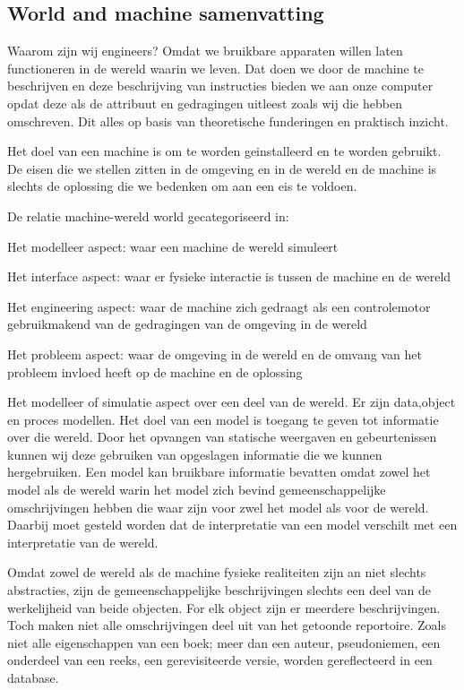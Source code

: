 \subsection{World and machine samenvatting}
Waarom zijn wij engineers? Omdat we bruikbare apparaten willen laten functioneren in de wereld waarin we leven. Dat doen we door de machine te beschrijven en deze beschrijving van instructies bieden we aan onze computer opdat deze als de attribuut en gedragingen uitleest zoals wij die hebben omschreven. Dit alles op basis van theoretische funderingen en praktisch inzicht. 

Het doel van een machine is om te worden geinstalleerd en te worden gebruikt. De eisen die we stellen zitten in de omgeving en in de wereld en de machine is slechts de oplossing die we bedenken om aan een eis te voldoen. 

De relatie machine-wereld world gecategoriseerd in: 

Het modelleer aspect: waar een machine de wereld simuleert 

Het interface aspect: waar er fysieke interactie is tussen de machine en de wereld 

Het engineering aspect: waar de machine zich gedraagt als een controlemotor gebruikmakend van de gedragingen van de omgeving in de wereld 

Het probleem aspect: waar de omgeving in de wereld en de omvang van het probleem invloed heeft op de machine en de oplossing 

Het modelleer  of simulatie aspect over een deel van de wereld. Er zijn data,object en proces modellen. Het doel van een model is toegang te geven tot informatie over die wereld. Door het opvangen van statische weergaven en gebeurtenissen kunnen wij deze gebruiken van opgeslagen informatie die we kunnen hergebruiken. Een model kan bruikbare informatie bevatten omdat zowel het model als de wereld warin het model zich bevind gemeenschappelijke omschrijvingen hebben die waar zijn voor zwel het model als voor de wereld. Daarbij moet gesteld worden dat de interpretatie van een model verschilt met een interpretatie van de wereld. 

Omdat zowel de wereld als de machine fysieke realiteiten zijn an niet slechts abstracties, zijn de gemeenschappelijke beschrijvingen slechts een deel van de werkelijheid van beide objecten. For elk object zijn er meerdere beschrijvingen. Toch maken niet alle omschrijvingen deel uit van het getoonde reportoire. Zoals niet alle eigenschappen van een boek; meer dan een auteur, pseudoniemen, een onderdeel van een reeks, een gerevisiteerde versie, worden gereflecteerd in een database.  

